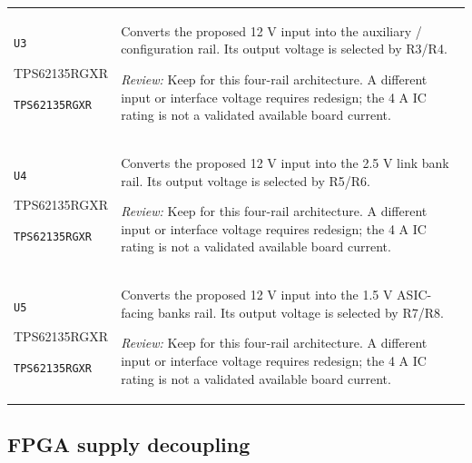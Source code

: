\documentclass[10pt,a4paper]{article}
\begin{document}
\begin{longtable}{@{}P{46mm}P{117mm}@{}}
\nolinkurl{U3}\par TPS62135RGXR\par\scriptsize \nolinkurl{TPS62135RGXR} & Converts the proposed 12 V input into the auxiliary / configuration rail. Its output voltage is selected by R3/R4.\par\smallskip\textit{Review:} Keep for this four-rail architecture. A different input or interface voltage requires redesign; the 4 A IC rating is not a validated available board current. \\
\nolinkurl{U4}\par TPS62135RGXR\par\scriptsize \nolinkurl{TPS62135RGXR} & Converts the proposed 12 V input into the 2.5 V link bank rail. Its output voltage is selected by R5/R6.\par\smallskip\textit{Review:} Keep for this four-rail architecture. A different input or interface voltage requires redesign; the 4 A IC rating is not a validated available board current. \\
\nolinkurl{U5}\par TPS62135RGXR\par\scriptsize \nolinkurl{TPS62135RGXR} & Converts the proposed 12 V input into the 1.5 V ASIC-facing banks rail. Its output voltage is selected by R7/R8.\par\smallskip\textit{Review:} Keep for this four-rail architecture. A different input or interface voltage requires redesign; the 4 A IC rating is not a validated available board current. \\
\end{longtable}\endgroup

\Needspace{35mm}\subsection{FPGA supply decoupling}
\end{document}
